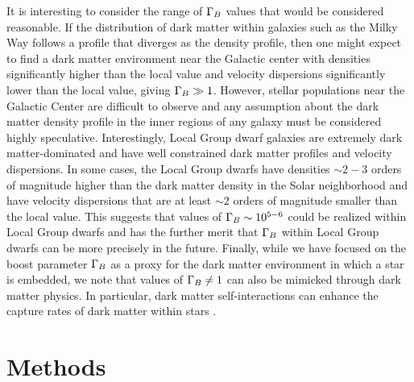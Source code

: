 \documentclass[useAMS,usenatbib]{mnras}
\begin{document}
  It is interesting to consider the range of $\Gamma_B$ values that would be considered reasonable. If the distribution of
  dark matter within galaxies such as the Milky Way follows a profile that diverges as the
  \citet[][NFW]{nfwprofile} density profile, then one might expect to find a dark matter environment near the Galactic center with
  densities significantly higher than the local value and velocity dispersions significantly
  lower than the local value, giving $\Gamma_B \gg 1$.
  However, stellar populations near the Galactic Center
  are difficult to observe and any assumption about the dark matter density profile in the
  inner regions of any galaxy must be considered highly speculative.
  Interestingly, Local Group dwarf galaxies are extremely dark matter-dominated
  and have well constrained dark matter profiles and velocity dispersions.
  In some cases, the Local Group dwarfs have densities $\sim 2-3$ orders
  of magnitude higher than the dark matter density in the Solar neighborhood
  and have velocity dispersions that are at least $\sim 2$ orders of magnitude
  smaller than the local value. This suggests that values of $\Gamma_B \sim 10^{5-6}$
  could be realized within Local Group dwarfs and has the further merit that
  $\Gamma_B$ within Local Group dwarfs can be  more precisely in the future.
  Finally, while we have focused on the boost parameter $\Gamma_B$ as a proxy for
  the dark matter environment in which a star is embedded, we note that values
  of $\Gamma_B \ne 1$ can also be mimicked through dark matter physics.
  In particular,
  dark matter self-interactions can enhance the capture rates of dark
  matter within stars \citep{Zentner2009High-energySun}.


\section{Methods}
\label{sec:methods}
\end{document}
